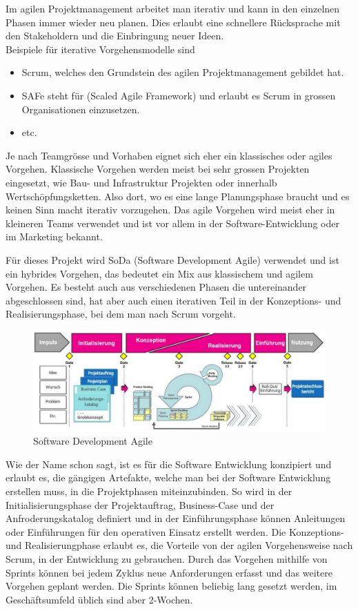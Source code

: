 \documentclass[a4paper, table]{article}
\begin{document}
Im agilen Projektmanagement arbeitet man iterativ und kann in den einzelnen Phasen immer wieder neu planen.
Dies erlaubt eine schnellere Rücksprache mit den Stakeholdern und die Einbringung neuer Ideen. \\
Beispiele für iterative Vorgehensmodelle sind
\begin{itemize}
    \item Scrum, welches den Grundstein des agilen Projektmanagement gebildet hat.
    \item SAFe steht für (Scaled Agile Framework) und erlaubt es Scrum in grossen Organisationen einzusetzen.
    \item etc. \autocite{noauthor_liste_2022}
\end{itemize}

Je nach Teamgrösse und Vorhaben eignet sich eher ein klassisches oder agiles Vorgehen.
Klassische Vorgehen werden meist bei sehr grossen Projekten eingesetzt, wie Bau- und Infrastruktur Projekten oder
innerhalb Wertschöpfungsketten. Also dort, wo es eine lange Planungsphase braucht und es keinen Sinn macht iterativ vorzugehen.
Das agile Vorgehen wird meist eher in kleineren Teams verwendet und ist vor allem in der Software-Entwicklung oder
im Marketing bekannt.
\newline

Für dieses Projekt wird SoDa (Software Development Agile) verwendet und ist ein hybrides Vorgehen,
das bedeutet ein Mix aus klassischem und agilem Vorgehen.
Es besteht auch aus verschiedenen Phasen die untereinander abgeschlossen sind,
hat aber auch einen iterativen Teil in der Konzeptions- und Realisierungsphase, bei dem man nach Scrum vorgeht.

\begin{figure}[h]
    \centering
    \includegraphics[width=1.0\textwidth]{img/SoDa.png}
    \caption{Software Development Agile}
    \label{fig:SoDa}
\end{figure}


Wie der Name schon sagt, ist es für die Software Entwicklung konzipiert und erlaubt es, die gängigen Artefakte,
welche man bei der Software Entwicklung erstellen muss, in die Projektphasen miteinzubinden.
So wird in der Initialisierungsphase der Projektauftrag, Business-Case und der Anfroderungskatalog definiert und
in der Einführungsphase können Anleitungen oder Einführungen für den operativen Einsatz erstellt werden.
Die Konzeptions- und Realisierungphase erlaubt es, die Vorteile von der agilen Vorgehensweise nach Scrum,
in der Entwicklung zu gebrauchen. Durch das Vorgehen mithilfe von Sprints können bei jedem Zyklus neue
Anforderungen erfasst und das weitere Vorgehen geplant werden. Die Sprints können beliebig lang gesetzt werden,
im Geschäftsumfeld üblich sind aber 2-Wochen.
\end{document}
